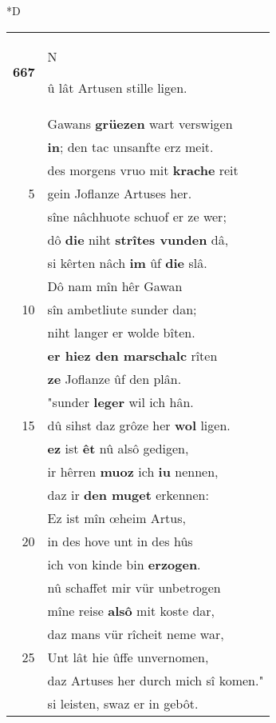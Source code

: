 \documentclass[8pt,a4paper,notitlepage]{article}
\begin{document}
\begin{table}[ht]
\begin{minipage}[t]{0.5\linewidth}
\small
\begin{center}*D
\end{center}
\begin{tabular}{rl}
\textbf{667} & \begin{large}N\end{large}û lât Artusen stille ligen.\\ 
 & Gawans \textbf{grüezen} wart verswigen\\ 
 & \textbf{in}; den tac unsanfte erz meit.\\ 
 & des morgens vruo mit \textbf{krache} reit\\ 
5 & gein Joflanze Artuses her.\\ 
 & sîne nâchhuote schuof er ze wer;\\ 
 & dô \textbf{die} niht \textbf{strîtes vunden} dâ,\\ 
 & si kêrten nâch \textbf{im} ûf \textbf{die} slâ.\\ 
 & Dô nam mîn hêr Gawan\\ 
10 & sîn ambetliute sunder dan;\\ 
 & niht langer er wolde bîten.\\ 
 & \textbf{er hiez den marschalc} rîten\\ 
 & \textbf{ze} Joflanze ûf den plân.\\ 
 & "sunder \textbf{leger} wil ich hân.\\ 
15 & dû sihst daz grôze her \textbf{wol} ligen.\\ 
 & \textbf{ez} ist \textbf{êt} nû alsô gedigen,\\ 
 & ir hêrren \textbf{muoz} ich \textbf{iu} nennen,\\ 
 & daz ir \textbf{den muget} erkennen:\\ 
 & Ez ist mîn œheim Artus,\\ 
20 & in des hove unt in des hûs\\ 
 & ich von kinde bin \textbf{erzogen}.\\ 
 & nû schaffet mir vür unbetrogen\\ 
 & mîne reise \textbf{alsô} mit koste dar,\\ 
 & daz mans vür rîcheit neme war,\\ 
25 & Unt lât hie ûffe unvernomen,\\ 
 & daz Artuses her durch mich sî komen."\\ 
 & si leisten, swaz er in gebôt.\\ 

\end{tabular}
\end{minipage}
\end{table}
\end{document}
